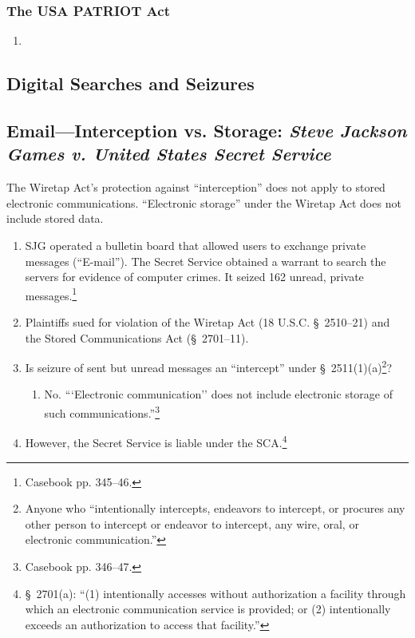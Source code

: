 \subsubsection{The USA PATRIOT Act}

\begin{enumerate}
    \item %
\end{enumerate}

\subsection{Digital Searches and Seizures}

\subsection{Email---Interception vs. Storage: \emph{Steve Jackson Games v. 
United States Secret Service}}

The Wiretap Act's protection against ``interception'' does not apply to 
stored electronic communications. ``Electronic storage'' under the Wiretap Act 
does not include stored data.

\begin{enumerate}
    \item SJG operated a bulletin board that allowed users to exchange private 
    messages (``E-mail''). The Secret Service obtained a warrant to search the 
    servers for evidence of computer crimes. It seized 162 unread, private 
    messages.\footnote{Casebook pp. 345--46.}
    \item Plaintiffs sued for violation of the Wiretap Act (18 U.S.C. \S\ 
    2510--21) and the Stored Communications Act (\S\ 2701--11).
    \item Is seizure of sent but unread messages an ``intercept'' under \S\ 
    2511(1)(a)\footnote{Anyone who ``intentionally intercepts, endeavors to 
    intercept, or procures any other person to intercept or endeavor to 
    intercept, any wire, oral, or electronic communication.''}?
    \begin{enumerate}
        \item No. ```Electronic communication'' does not include electronic 
        storage of such communications.''\footnote{Casebook pp. 346--47.}
    \end{enumerate}
    \item However, the Secret Service is liable under the SCA.\footnote{\S\ 
    2701(a): ``(1) intentionally accesses without authorization a facility 
    through which an electronic communication service is provided; or (2) 
    intentionally exceeds an authorization to access that facility.''}
\end{enumerate}

